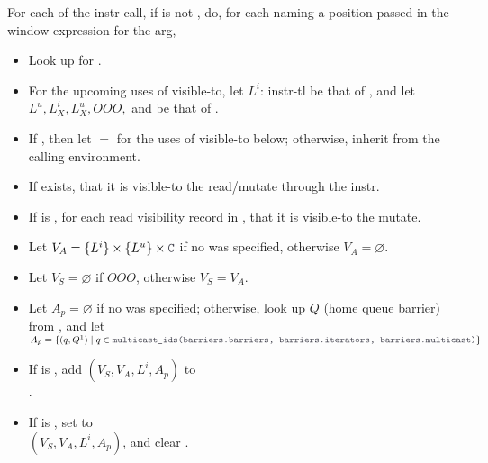 \filbreak
{} For each  of the instr call, if  is not , do, for each  naming a position passed in the window expression for the arg,
\begin{itemize}
  \item Look up  for .
  \filbreak
  \item For the upcoming uses of visible-to, let $L^i$: instr-tl be that of , and let $L^u, L_X^i, L_X^u, OOO,$ and  be that of .
  \filbreak
\item If , then let  $=$  for the uses of visible-to below; otherwise, inherit  from the calling environment.
  \filbreak
  \item If  exists,  that it is visible-to the read/mutate through the instr.
  \filbreak
  \item If  is , for each read visibility record in ,  that it is visible-to the mutate.
  \filbreak
  \item Let $V_A = \{ L^i \} \times \{ L^u \} \times \lighttt{C}$ if no  was specified, otherwise $V_A = \varnothing$.
  \filbreak
  \item Let $V_S = \varnothing$ if $OOO$, otherwise $V_S = V_A$.
  \filbreak
  \item Let $A_p = \varnothing$ if no  was specified; otherwise, look up $Q$ (home queue barrier) from , and let\\
    $A_p = \{ (q, Q^1) \mid q \in \lighttt{multicast\_ids(barriers.barriers, barriers.iterators, barriers.multicast)} \}$
  \filbreak
  \item If  is , add $(V_S, V_A, L^i, A_p)$ to\\ .
  \filbreak
  \item If  is , set  to\\ $(V_S, V_A, L^i, A_p)$, and clear .
\end{itemize}

